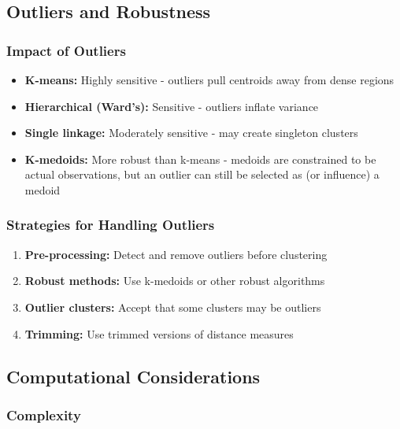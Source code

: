 \documentclass[
]{article}
\begin{document}
\textbf{ }

\subsection{Outliers and Robustness}

\subsubsection{Impact of Outliers}

\begin{itemize}
\item
  \textbf{K-means:} Highly sensitive - outliers pull centroids away from
  dense regions
\item
  \textbf{Hierarchical (Ward's):} Sensitive - outliers inflate variance
\item
  \textbf{Single linkage:} Moderately sensitive - may create singleton
  clusters
\item
  \textbf{K-medoids:} More robust than k-means - medoids are constrained
  to be actual observations, but an outlier can still be selected as (or
  influence) a medoid
\end{itemize}

\subsubsection{Strategies for Handling Outliers}

\begin{enumerate}
\item
  \textbf{Pre-processing:} Detect and remove outliers before clustering
\item
  \textbf{Robust methods:} Use k-medoids or other robust algorithms
\item
  \textbf{Outlier clusters:} Accept that some clusters may be outliers
\item
  \textbf{Trimming:} Use trimmed versions of distance measures
\end{enumerate}

\textbf{ }

\subsection{Computational Considerations}

\subsubsection{Complexity}
\end{document}
